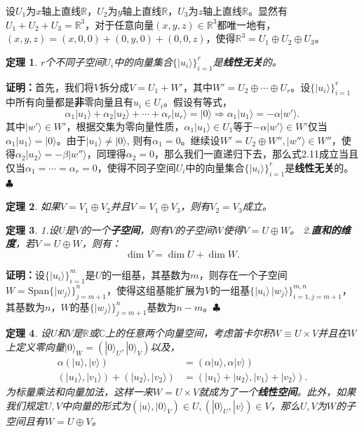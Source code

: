 \documentclass[mathserif,hyperref,UTF8,openany,b5paper]{ctexbook}
\newtheorem{thm}{定理}[section]
\begin{document}
设$U_1$为$x$轴上直线$\mathbb{R}$，$U_2$为$y$轴上直线$\mathbb{R}$，$U_3$为$z$轴上直线$\mathbb{R}$。显然有$U_1+U_2+U_3=\mathbb{R}^3$，对于任意向量$(x,y,z)\in\mathbb{R}^3$都唯一地有，$(x,y,z)=(x,0,0)+(0,y,0)+(0,0,z)$，使得$\mathbb{R}^3=U_1\oplus U_2 \oplus U_3$。
\begin{thm}
$r$个不同子空间$U_i$中的向量集合$\{|u_i\rangle\}^r_{i=1}$是\textbf{线性无关}的。
\end{thm}
\textbf{证明：}首先，我们将$V$拆分成$V=U_1+W'$，其中$W'=U_2\oplus\cdots\oplus U_r$。设$\{|u_i\rangle\}^r_{i=1}$中所有向量都是\textbf{非}零向量且有$u_i\in U_i$。假设有等式，
\begin{equation}
\alpha_1|u_1\rangle+\alpha_2|u_2\rangle+\cdots+\alpha_r|u_r\rangle=|0\rangle \Rightarrow \alpha_1|u_1\rangle=-\alpha|w'\rangle.
\end{equation}其中$|w'\rangle \in W'$，根据交集为零向量性质，$\alpha_1|u_1\rangle\in U_1$等于$-\alpha|w'\rangle\in W'$仅当$\alpha_1|u_1\rangle=|0\rangle$。由于$|u_1\rangle \neq |0\rangle$, 则有$\alpha_1=0$。继续设$W'=U_2\oplus W'',|w''\rangle \in W''$，使得$\alpha_2|u_2\rangle=-\beta|w''\rangle$，同理得$\alpha_2=0$，那么我们一直递归下去，那么式2.11成立当且仅当$\alpha_1=\cdots=\alpha_r = 0$，使得不同子空间$U_i$中的向量集合$\{|u_i\rangle\}^r_{i=1}$是\textbf{线性无关}的。$\clubsuit$
\begin{thm}
如果$V = V_1\oplus V_2$并且$V = V_1\oplus V_3$，则有$V_2=V_3$成立。
\end{thm} 
\begin{thm}
1.设$U$是$V$的一个\textbf{子空间}，则有$V$的子空间$W$使得$V = U\oplus W$。
2.\textbf{直和的维度}，若$V = U\oplus W$，则有：
\begin{equation}
\boxed{\dim V = \dim U + \dim W}.
\end{equation}
\end{thm}
\textbf{证明：}设$\{|u_i \rangle\}^m_{i=1}$是$U$的一组基，其基数为$m$，则存在一个子空间$W = \mbox{Span}\{|w_j\rangle\}^n_{j=m+1}$，使得这组基能扩展为$V$的一组基$\{|u_i \rangle\,|w_j \rangle\}^{m,n}_{i=1,j=m+1}$，其基数为$n$，$W$的基$\{|w_j\rangle\}^n_{j=m+1}$基数为$n-m$。$\clubsuit$
\begin{thm}
设$U$和$V$是$\mathbb{R}$或$\mathbb{C}$上的任意两个向量空间，考虑笛卡尔积$W\equiv U\times V$并且在$W$上定义零向量$|0\rangle_W = (|0\rangle_U,|0\rangle_V)$以及，
\begin{align}
    \alpha(|u\rangle,|v\rangle)&=(\alpha|u\rangle,\alpha|v\rangle)\\
    (|u_1\rangle,|v_1\rangle)+(|u_2\rangle,|v_2\rangle)&=(|u_1\rangle+|u_2\rangle,|v_1\rangle+|v_2\rangle).
\end{align}
为标量乘法和向量加法，这样一来$W=U\times V$就成为了一个\textbf{线性空间}。此外，如果我们规定$U,V$中向量的形式为$(|u\rangle,|0\rangle_V)\in U, (|0\rangle_U,|v\rangle)\in V$，那么$U,V$为$W$的子空间且有$W=U\oplus V$。
\end{thm}
\end{document}
